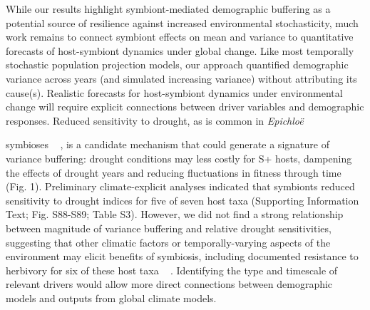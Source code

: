 \documentclass[lineno,sn-nature]{sn-jnl}%
\providecommand{\DIFadd}[1]{{\protect\color{blue}#1}} %
\providecommand{\DIFadd}[1]{{\protect\color{blue}\uwave{#1}}} %
\begin{document}
\DIFadd{While our results highlight symbiont-mediated demographic buffering as a potential source of resilience against increased environmental stochasticity, much work remains to connect symbiont effects on mean and variance to quantitative forecasts of host-symbiont dynamics under global change. 
Like most temporally stochastic population projection models, our approach quantified demographic variance across years (and simulated increasing variance) without attributing its cause(s). 
Realistic forecasts for host-symbiont dynamics under environmental change will require explicit connections between driver variables and demographic responses. 
Reduced sensitivity to drought, as is common in }\emph{\DIFadd{Epichlo\"{e}}} \DIFadd{symbioses \mbox{%
\cite{reyna2012detection,saikkonen2013chemical,neyaz2022localization,decunta2021systematic}}\hspace{0pt}%
, is a candidate mechanism that could generate a signature of variance buffering: drought conditions may less costly for S+ hosts, dampening the effects of drought years and reducing fluctuations in fitness through time (Fig. 1).
Preliminary climate-explicit analyses indicated that symbionts reduced sensitivity to drought indices for five of seven host taxa (Supporting Information Text; Fig. S88-S89; Table S3).
However, we did not find a strong relationship between magnitude of variance buffering and relative drought sensitivities, suggesting that other climatic factors or temporally-varying aspects of the environment may elicit benefits of symbiosis, including documented resistance to herbivory for six of these host taxa \mbox{%
\cite{rudgers2008invasive,crawford2010fungal}}\hspace{0pt}%
.
Identifying the type and timescale of relevant drivers would allow more direct connections between demographic models and outputs from global climate models.

}
\end{document}
